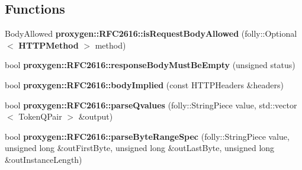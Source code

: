 \subsection*{Functions}
\begin{DoxyCompactItemize}
\item 
Body\+Allowed {\bf proxygen\+::\+R\+F\+C2616\+::is\+Request\+Body\+Allowed} (folly\+::\+Optional$<$ {\bf H\+T\+T\+P\+Method} $>$ method)
\item 
bool {\bf proxygen\+::\+R\+F\+C2616\+::response\+Body\+Must\+Be\+Empty} (unsigned status)
\item 
bool {\bf proxygen\+::\+R\+F\+C2616\+::body\+Implied} (const H\+T\+T\+P\+Headers \&headers)
\item 
bool {\bf proxygen\+::\+R\+F\+C2616\+::parse\+Qvalues} (folly\+::\+String\+Piece value, std\+::vector$<$ Token\+Q\+Pair $>$ \&output)
\item 
bool {\bf proxygen\+::\+R\+F\+C2616\+::parse\+Byte\+Range\+Spec} (folly\+::\+String\+Piece value, unsigned long \&out\+First\+Byte, unsigned long \&out\+Last\+Byte, unsigned long \&out\+Instance\+Length)
\end{DoxyCompactItemize}
